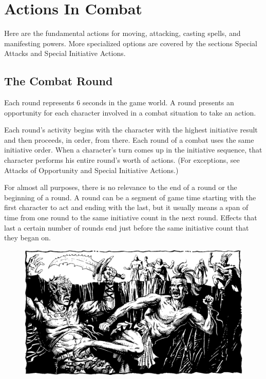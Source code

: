 \section{Actions In Combat}
Here are the fundamental actions for moving, attacking, casting spells, and manifesting powers. More specialized options are covered by the sections Special Attacks and Special Initiative Actions.

\subsection{The Combat Round}
Each round represents 6 seconds in the game world. A round presents an opportunity for each character involved in a combat situation to take an action.

Each round's activity begins with the character with the highest initiative result and then proceeds, in order, from there. Each round of a combat uses the same initiative order. When a character's turn comes up in the initiative sequence, that character performs his entire round's worth of actions. (For exceptions, see Attacks of Opportunity and Special Initiative Actions.)

For almost all purposes, there is no relevance to the end of a round or the beginning of a round. A round can be a segment of game time starting with the first character to act and ending with the last, but it usually means a span of time from one round to the same initiative count in the next round. Effects that last a certain number of rounds end just before the same initiative count that they began on.



\begin{figure}[t!]
\centering
\includegraphics[width=\textwidth]{images/monk-1.png}
\WOTC
\end{figure}






\vskip1cm

